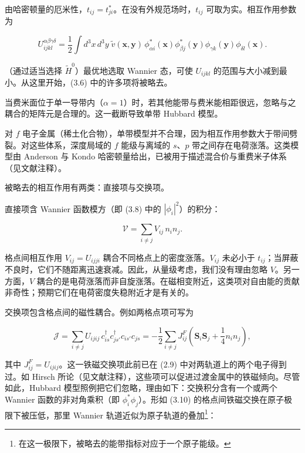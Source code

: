 由哈密顿量的厄米性，$t_{ij} = t_{ji}^{*}$。在没有外规范场时，$t_{ij}$ 可取为实。相互作用参数为

\begin{equation*}
U _ {ijkl} ^ {\alpha \beta \gamma \delta} = \frac {1}{2} \int d ^ {3} x \, d ^ {3} y \; \tilde {v} (\mathbf {x}, \mathbf {y}) \, \phi_ {\alpha i} ^ {*} (\mathbf {x}) \phi_ {\beta j} ^ {*} (\mathbf {y}) \phi_ {\gamma k} (\mathbf {y}) \phi_ {\delta l} (\mathbf {x}).
\tag{3.8}
\end{equation*}

（通过适当选择 $\tilde{H}^{0}$）最优地选取 Wannier 态，可使 $U_{ijkl}$ 的范围与大小减到最小。从这里开始，(3.6) 中的许多项将被略去。

当费米面位于单一导带内（$\alpha = 1$）时，若其他能带与费米能相距很远，忽略与之耦合的矩阵元是合理的。这一截断导致单带 Hubbard 模型。

对 $f$ 电子金属（稀土化合物），单带模型并不合理，因为相互作用参数大于带间劈裂。对这些体系，深度局域的 $f$ 能级与离域的 $s$、$p$ 带之间存在电荷涨落。这类模型由 Anderson 与 Kondo 哈密顿量给出，已被用于描述混合价与重费米子体系（见文献注释）。

被略去的相互作用有两类：直接项与交换项。

直接项含 Wannier 函数模方（即 (3.8) 中的 $|\phi_{i}|^{2}$）的积分：

\begin{equation*}
\mathcal {V} = \sum_ {i \neq j} V _ {ij} \, n _ {i} n _ {j}.
\tag{3.9}
\end{equation*}

格点间相互作用 $V_{ij} = U_{ijji}$ 耦合不同格点上的密度涨落。$V_{ij}$ 未必小于 $t_{ij}$；当屏蔽不良时，它们不随距离迅速衰减。因此，从量级考虑，我们没有理由忽略 $V$。另一方面，$V$ 耦合的是电荷涨落而非自旋涨落。在磁相变附近，这类项对自由能的贡献非奇性；预期它们在电荷密度失稳附近才是有关的。

交换项包含格点间的磁性耦合。例如两格点项可写为

\begin{equation*}
\mathcal {J} = \sum_ {i \neq j} U _ {ijij} \, c _ {is} ^ {\dagger} c _ {js'} ^ {\dagger} c _ {is'} c _ {js} = - \frac {1}{2} \sum_ {i \neq j} J _ {ij} ^ {F} \left( \mathbf {S} _ {i} \mathbf {S} _ {j} + \frac {1}{4} n _ {i} n _ {j} \right),
\tag{3.10}
\end{equation*}

其中 $J_{ij}^{F} = U_{ijij}$。这一铁磁交换项此前已在 (2.9) 中对两轨道上的两个电子得到过。如 Hirsch 所论（见文献注释），这些项可以促进过渡金属中的铁磁倾向。尽管如此，Hubbard 模型照例把它们忽略，理由如下：交换积分含有一个或两个 Wannier 函数的非对角乘积（即 $\phi_{i}^{*}\phi_{j}$）。形如 (3.10) 的格点间铁磁交换在原子极限下被压低，那里 Wannier 轨道近似为原子轨道的叠加\footnote{在这一极限下，被略去的能带指标对应于一个原子能级。}：

